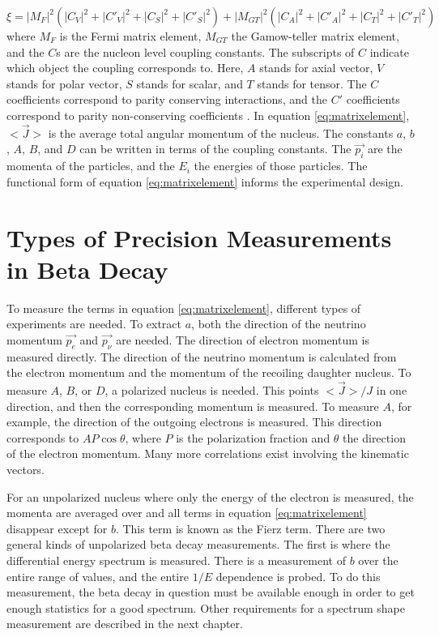 \documentclass[../MaxHughesThesis.tex]{subfiles}
\begin{document}
\begin{equation}
	\xi = |M_{F}|^{2} (|C_{V}|^{2} + |C'_{V}|^{2} + |C_{S}|^{2} + |C'_{S}|^{2}) +  |M_{GT}|^{2} (|C_{A}|^{2} + |C'_{A}|^{2} + |C_{T}|^{2} + |C'_{T}|^{2})
	\label{eq:xiwrittenout}
\end{equation}
where $M_{F}$ is the Fermi matrix element, $M_{GT}$ the Gamow-teller matrix element, and the $C$s are the nucleon level coupling constants.
The subscripts of $C$ indicate which object the coupling corresponds to. 
Here, $A$ stands for axial vector, $V$ stands for polar vector, $S$ stands for scalar, and $T$ stands for tensor. 
The $C$ coefficients correspond to parity conserving interactions, and the $C'$ coefficients correspond to parity non-conserving coefficients \cite{Lee56}. 
In equation \ref{eq:matrixelement}, $<\vec{J}>$ is the average total angular momentum of the nucleus. 
The constants $a$, $b$, $A$, $B$, and $D$ can be written in terms of the coupling constants.
The $\vec{p_{i}}$ are the momenta of the particles, and the $E_{i}$ the energies of those particles.
The functional form of equation \ref{eq:matrixelement} informs the experimental design.

\section{Types of Precision Measurements in Beta Decay}
To measure the terms in equation \ref{eq:matrixelement}, different types of experiments are needed.
To extract $a$, both the direction of the neutrino momentum $\vec{p_{e}}$ and $\vec{p_{\nu}}$ are needed.  
The direction of electron momentum is measured directly. 
The direction of the neutrino momentum is calculated from the electron momentum and the momentum of the recoiling daughter nucleus. 
To measure $A$, $B$, or $D$, a polarized nucleus is needed.
This points $<\vec{J}>/J$ in one direction, and then the corresponding momentum is measured.
To measure $A$, for example, the direction of the outgoing electrons is measured.
This direction corresponds to $AP\cos{\theta}$, where $P$ is the polarization fraction and $\theta$ the direction of the electron momentum.
Many more correlations exist involving the kinematic vectors.

For an unpolarized nucleus where only the energy of the electron is measured, the momenta are averaged over and all terms in equation \ref{eq:matrixelement} disappear except for $b$.
This term is known as the Fierz term.
There are two general kinds of unpolarized beta decay measurements.
The first is where the differential energy spectrum is measured.
There is a measurement of $b$ over the entire range of values, and the entire $1/E$ dependence is probed.
To do this measurement, the beta decay in question must be available enough in order to get enough statistics for a good spectrum.
Other requirements for a spectrum shape measurement are described in the next chapter.
\end{document}
